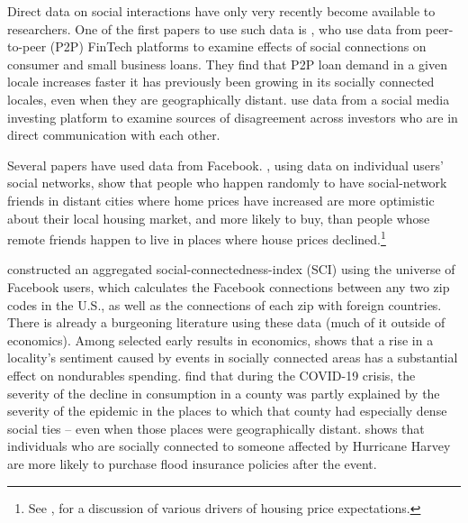 Direct data on social interactions have only very recently become available to researchers.  One of the first papers to use such data is \cite{allen2018social}, who use data from peer-to-peer (P2P) FinTech platforms to examine effects of social connections on consumer and small business loans.  They find that P2P loan demand in a given locale increases faster it has previously been growing in its socially connected locales, even when they are geographically distant.  \cite{cookson_why_2020} use data from a social media investing platform to examine sources of disagreement across investors who are in direct communication with each other.

Several papers have used data from Facebook.  \href{https://www.journals.uchicago.edu/doi/abs/10.1086/700073}{\cite{bailey2018economic,bailey2019house}}, using data on individual users' social networks, show that people who happen randomly to have social-network friends in distant cities where home prices have increased are more optimistic about their local housing market, and more likely to buy, than people whose remote friends happen to live in places where house prices declined.\footnote{See \kpshousingexpectationFull, for a discussion of various drivers of housing price expectations.}

\cite{bailey_social_2018} constructed an aggregated social-connectedness-index (SCI)  using the universe of Facebook users, which calculates the Facebook connections between any two zip codes in the U.S., as well as the connections of each zip with foreign countries.  There is already a burgeoning literature using these data (much of it outside of economics).  Among selected early results in economics, \cite{makridis2019effect} shows that a rise in a locality's sentiment caused by events in socially connected areas has a substantial effect on nondurables spending.  \cite{makridis2020learning} find that during the COVID-19 crisis, the severity of the decline in consumption in a county was partly explained by the severity of the epidemic in the places to which that county had especially dense social ties -- even when those places were geographically distant.
\cite{ratnadiwakara2021flooded} shows that individuals who are socially connected to someone affected by Hurricane Harvey are more likely to purchase flood insurance policies after the event. %

